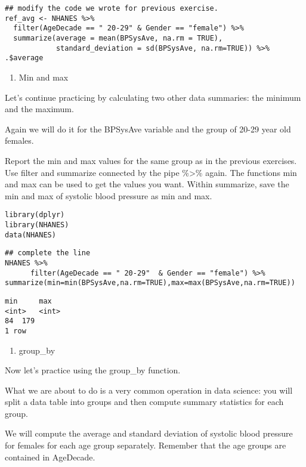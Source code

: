 \documentclass[]{article}
\providecommand{\tightlist}{%
  \setlength{\itemsep}{0pt}\setlength{\parskip}{0pt}}
\begin{document}
\begin{verbatim}
## modify the code we wrote for previous exercise.
ref_avg <- NHANES %>%
  filter(AgeDecade == " 20-29" & Gender == "female") %>%
  summarize(average = mean(BPSysAve, na.rm = TRUE), 
            standard_deviation = sd(BPSysAve, na.rm=TRUE)) %>% .$average
\end{verbatim}

\begin{enumerate}
\def\labelenumi{\arabic{enumi}.}
\setcounter{enumi}{3}
\tightlist
\item
  Min and max
\end{enumerate}

Let's continue practicing by calculating two other data summaries: the
minimum and the maximum.

Again we will do it for the BPSysAve variable and the group of 20-29
year old females.

Report the min and max values for the same group as in the previous
exercises. Use filter and summarize connected by the pipe
\%\textgreater{}\% again. The functions min and max can be used to get
the values you want. Within summarize, save the min and max of systolic
blood pressure as min and max.

\begin{verbatim}
library(dplyr)
library(NHANES)
data(NHANES)
\end{verbatim}

\begin{verbatim}
## complete the line
NHANES %>%
      filter(AgeDecade == " 20-29"  & Gender == "female") %>% summarize(min=min(BPSysAve,na.rm=TRUE),max=max(BPSysAve,na.rm=TRUE))
\end{verbatim}

\begin{verbatim}
min     max
<int>   <int>
84  179
1 row
\end{verbatim}

\begin{enumerate}
\def\labelenumi{\arabic{enumi}.}
\setcounter{enumi}{4}
\tightlist
\item
  group\_by
\end{enumerate}

Now let's practice using the group\_by function.

What we are about to do is a very common operation in data science: you
will split a data table into groups and then compute summary statistics
for each group.

We will compute the average and standard deviation of systolic blood
pressure for females for each age group separately. Remember that the
age groups are contained in AgeDecade.
\end{document}

